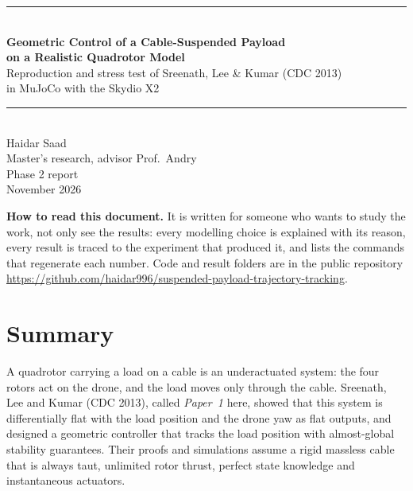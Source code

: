 \documentclass[11pt,a4paper]{article}
\begin{document}
\begin{titlepage}
\centering
\vspace*{2.5cm}
{\color{accent}\rule{\textwidth}{1.2pt}}\\[14pt]
{\LARGE\bfseries Geometric Control of a Cable-Suspended Payload\\[4pt] on a Realistic Quadrotor Model}\\[10pt]
{\large Reproduction and stress test of Sreenath, Lee \& Kumar (CDC 2013)\\ in MuJoCo with the Skydio X2}\\[14pt]
{\color{accent}\rule{\textwidth}{1.2pt}}\\[1.6cm]
{\large Haidar Saad}\\[4pt]
Master's research, advisor Prof.\ Andry\\[1.2cm]
{\large Phase 2 report}\\[4pt]
November 2026\\[2.2cm]
\begin{minipage}{0.82\textwidth}\small
\textbf{How to read this document.} It is written for someone who wants to study the work, not only see the
results: every modelling choice is explained with its reason, every result is traced to the experiment that produced
it, and  lists the commands that regenerate each number. Code and result folders are in the
public repository \url{https://github.com/haidar996/suspended-payload-trajectory-tracking}.
\end{minipage}
\end{titlepage}

\tableofcontents
\newpage

\section*{Summary}

A quadrotor carrying a load on a cable is an underactuated system: the four rotors act on the drone, and the load
moves only through the cable. Sreenath, Lee and Kumar (CDC 2013), called \emph{Paper~1} here, showed that this system
is differentially flat with the load position and the drone yaw as flat outputs, and designed a geometric controller
that tracks the load position with almost-global stability guarantees. Their proofs and simulations assume a rigid
massless cable that is always taut, unlimited rotor thrust, perfect state knowledge and instantaneous actuators.
\end{document}
